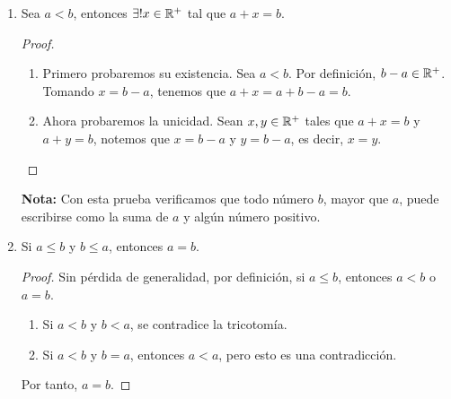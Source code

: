\begin{enumerate}[label=\alph*)]
% 
% 

\item Sea $a<b$, entonces $\exists! x\in \mathbb{R}^+$ tal que $a+x=b$.
 \begin{proof}\leavevmode
  \begin{enumerate}[label=\roman*)]
    \item Primero probaremos su existencia. Sea $a<b$. Por definición, $b-a\in \mathbb{R}^+$. Tomando $x=b-a$, tenemos que $a+x=a+b-a=b$.
    \item Ahora probaremos la unicidad. Sean $x,y\in \mathbb{R}^+$ tales que $a+x=b$ y $a+y=b$, notemos que $x=b-a$ y $y=b-a$, es decir, $x=y$. \qedhere
  \end{enumerate}
 \end{proof}
 
 \textbf{Nota:} Con esta prueba verificamos que todo número $b$, mayor que $a$, puede escribirse como la suma de $a$ y algún número positivo.
 
 \item Si $a\leq b$ y $b\leq a$, entonces $a=b$.
 \begin{proof}\leavevmode
  Sin pérdida de generalidad, por definición, si $a\leq b$, entonces $a<b$ o $a=b$.
  \begin{enumerate}[label=\roman*)]
    \item Si $a<b$ y $b<a$, se contradice la tricotomía. 
    \item Si $a<b$ y $b=a$, entonces $a<a$, pero esto es una contradicción.
  \end{enumerate}
  Por tanto, $a=b$.
 \end{proof}


\end{enumerate}
